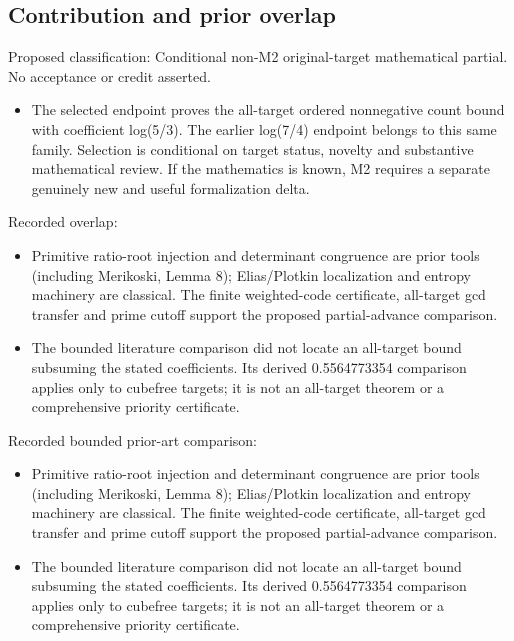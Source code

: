 \documentclass[11pt,a4paper]{article}
\begin{document}
\subsection{Contribution and prior overlap}
Proposed classification: Conditional non-M2 original-target mathematical partial. No acceptance or credit asserted.

\begin{itemize}
\item The selected endpoint proves the all-target ordered nonnegative count bound with coefficient log(5/3). The earlier log(7/4) endpoint belongs to this same family. Selection is conditional on target status, novelty and substantive mathematical review. If the mathematics is known, M2 requires a separate genuinely new and useful formalization delta.
\end{itemize}
Recorded overlap:

\begin{itemize}
\item Primitive ratio-root injection and determinant congruence are prior tools (including Merikoski, Lemma 8); Elias/Plotkin localization and entropy machinery are classical. The finite weighted-code certificate, all-target gcd transfer and prime cutoff support the proposed partial-advance comparison.
\end{itemize}
\begin{itemize}
\item The bounded literature comparison did not locate an all-target bound subsuming the stated coefficients. Its derived 0.5564773354 comparison applies only to cubefree targets; it is not an all-target theorem or a comprehensive priority certificate.
\end{itemize}
Recorded bounded prior-art comparison:

\begin{itemize}
\item Primitive ratio-root injection and determinant congruence are prior tools (including Merikoski, Lemma 8); Elias/Plotkin localization and entropy machinery are classical. The finite weighted-code certificate, all-target gcd transfer and prime cutoff support the proposed partial-advance comparison.
\end{itemize}
\begin{itemize}
\item The bounded literature comparison did not locate an all-target bound subsuming the stated coefficients. Its derived 0.5564773354 comparison applies only to cubefree targets; it is not an all-target theorem or a comprehensive priority certificate.
\end{itemize}
\end{document}
